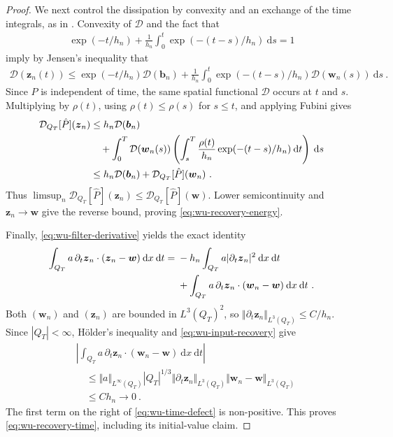 \documentclass{article}
\theoremstyle{definition}
\newcommand{\bfw}{\boldsymbol{w}}
\newcommand{\D}{\mathcal{D}}
\newcommand{\dd}{\:\mathrm{d}}
\newcommand{\bfz}{\boldsymbol{z}}
\begin{document}
\begin{proof}
We next control the dissipation by convexity and an exchange of the time
integrals, as in \cite[Lemma 3.3]{E25}. Convexity of $\D$ and the fact that
\begin{align*}
    \exp(-t/h_n)
       +\frac{1}{h_n}\int_0^t \exp(-(t-s)/h_n)\dd s  = 1
\end{align*}
imply by Jensen's inequality that
\begin{align*}
 \D(\bfz_n(t))\leq \exp(-t/h_n)\D(\boldsymbol{b}_n)
       +\frac{1}{h_n}\int_0^t \exp(-(t-s)/h_n)\D(\bfw_n(s))\dd s \ .
\end{align*}
Since $P$ is independent of time, the same spatial functional $\D$
occurs at $t$ and $s$. Multiplying by $\rho(t)$, using
$\rho(t)\leq\rho(s)$ for $s\leq t$, and applying Fubini gives
\begin{align}
 \D_{Q_T}[\hat P](\bfz_n)
 &\leq h_n\D(\boldsymbol{b}_n)\notag\\
 &\quad+\int_0^T\D(\bfw_n(s))
       \left(\int_s^T\frac{\rho(t)}{h_n}\exp(-(t-s)/h_n)\dd t\right)\dd s
       \notag\\
 &\leq h_n\D(\boldsymbol{b}_n)+\D_{Q_T}[\hat P](\bfw_n) \ .\label{eq:wu-filter-energy}
\end{align}
Thus $\limsup_n\D_{Q_T}[\hat P](\bfz_n)\leq\D_{Q_T}[\hat P](\bfw)$. Lower semicontinuity and $\bfz_n\rightarrow \bfw$
give the reverse bound, proving \eqref{eq:wu-recovery-energy}.

Finally, \eqref{eq:wu-filter-derivative} yields the exact identity
\begin{align}\label{eq:wu-time-defect}
 \int_{Q_T} a\,\partial_t \bfz_n\cdot(\bfz_n-\bfw)\dd x\dd t
 ={}&-h_n\int_{Q_T} a|\partial_t \bfz_n|^2\dd x\dd t\notag\\
   &+\int_{Q_T} a\,\partial_t \bfz_n\cdot(\bfw_n-\bfw)\dd x\dd t\ .
\end{align}
Both $(\bfw_n)$ and $(\bfz_n)$ are bounded in $L^3(Q_T)^2$, so
$\Vert\partial_t \bfz_n\Vert_{L^3(Q_T)}\leq C/h_n$. Since $|Q_T|<\infty$, H\"older's
inequality and \eqref{eq:wu-input-recovery} give
\begin{align*}
 &\left|\int_{Q_T} a\,\partial_t \bfz_n\cdot(\bfw_n-\bfw)\dd x\dd t\right|\\
 &\quad\leq\Vert a\Vert_{L^\infty(Q_T)} |Q_T|^{1/3}
       \Vert\partial_t \bfz_n\Vert_{L^3(Q_T)}\Vert\bfw_n-\bfw\Vert_{L^3(Q_T)}\\
 &\quad\leq C h_n\rightarrow0 \ .
\end{align*}
The first term on the right of \eqref{eq:wu-time-defect} is non-positive.
This proves \eqref{eq:wu-recovery-time}, including its initial-value claim.
\end{proof}
\end{document}
